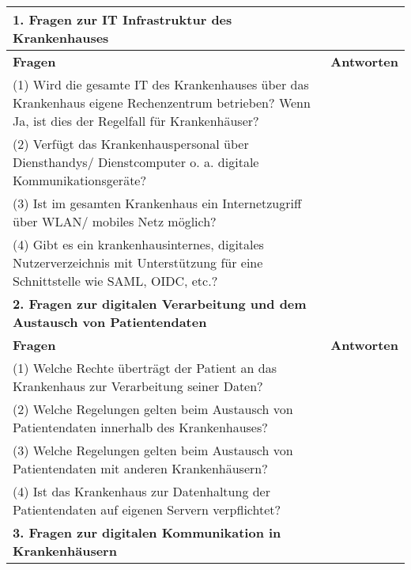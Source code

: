 \begin{longtable}{p{12cm}|p{3cm}}
  \hline
  \textbf{1. Fragen zur IT Infrastruktur des Krankenhauses}                                                                                                  \\ \hline
  \endfirsthead
  \textbf{Fragen}                                                                                                                                           &   \textbf{Antworten}   \\ \hline
(1) Wird die gesamte IT des Krankenhauses über das Krankenhaus eigene Rechenzentrum betrieben?  Wenn Ja, ist dies der Regelfall für Krankenhäuser? &     \\ \hline
(2) Verfügt das Krankenhauspersonal über Diensthandys/ Dienstcomputer o. a. digitale Kommunikationsgeräte?                                         &          \\ \hline
(3) Ist im gesamten Krankenhaus ein Internetzugriff über WLAN/ mobiles Netz möglich?                                                               &       \\ \hline
(4) Gibt es ein krankenhausinternes, digitales Nutzerverzeichnis mit Unterstützung für eine Schnittstelle wie SAML, OIDC, etc.?                   &          \\ \hline
  \hline
  \textbf{2. Fragen zur digitalen Verarbeitung und dem Austausch von Patientendaten}                                                                                                  \\ \hline
  \textbf{Fragen}                                                                                                                                           &   \textbf{Antworten}   \\ \hline
(1) Welche Rechte überträgt der Patient an das Krankenhaus zur Verarbeitung seiner Daten? &     \\ \hline
(2) Welche Regelungen gelten beim Austausch von Patientendaten innerhalb des Krankenhauses?                                       &          \\ \hline
(3) Welche Regelungen gelten beim Austausch von Patientendaten mit anderen Krankenhäusern?                                                             &       \\ \hline
(4) Ist das Krankenhaus zur Datenhaltung der Patientendaten auf eigenen Servern verpflichtet?                  &          \\ \hline
\hline
\textbf{3. Fragen zur digitalen Kommunikation in Krankenhäusern}                                                                                                  \\ \hline

\end{longtable}
